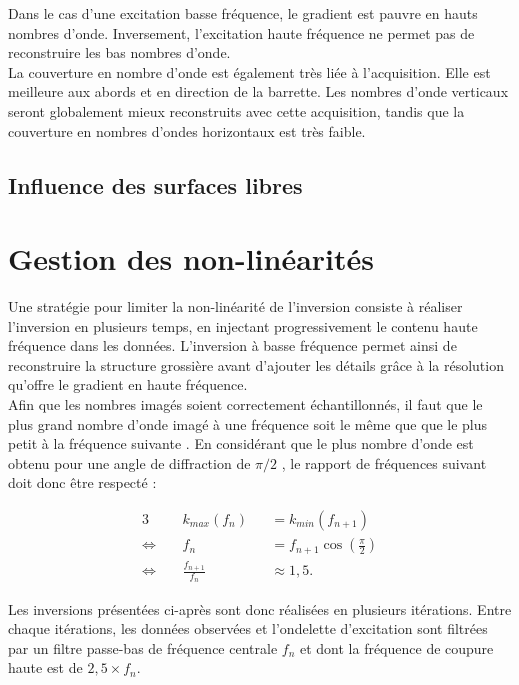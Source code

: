 Dans le cas d'une excitation basse fréquence, le gradient est pauvre en hauts nombres d'onde. Inversement, l'excitation haute fréquence ne permet pas de reconstruire les bas nombres d'onde.\\
La couverture en nombre d'onde est également très liée à l'acquisition. Elle est meilleure aux abords et en direction de la barrette. Les nombres d'onde verticaux seront globalement mieux reconstruits avec cette acquisition, tandis que la couverture en nombres d'ondes horizontaux est très faible.

\subsection{Influence des surfaces libres}


\section{Gestion des non-linéarités}
Une stratégie pour limiter la non-linéarité de l'inversion consiste à réaliser l'inversion en plusieurs temps, en injectant progressivement le contenu haute fréquence dans les données. L'inversion à basse fréquence permet ainsi de reconstruire la structure grossière avant d'ajouter les détails grâce à la résolution qu'offre le gradient en haute fréquence.\\



Afin que les nombres imagés soient correctement échantillonnés, il faut que le plus grand nombre d'onde imagé à une fréquence soit le même que que le plus petit à la fréquence suivante \citep{sirgue}. En considérant que le plus nombre d'onde est obtenu pour une angle de diffraction de $\pi/2$ , le rapport de fréquences suivant doit donc être respecté : 

\begin{alignat*}{3}
	  ~&k_{max}(f_{n}) &&= k_{min}(f_{n+1})\\
	\Leftrightarrow~~~~~ &  f_n &&= f_{n+1}\cos \left(\frac{\pi}{2} \right)\\
	 \Leftrightarrow~~~~~ & \frac{f_{n+1}}{f_n} && \approx  1,5.
\end{alignat*} 

Les inversions présentées ci-après sont donc réalisées en plusieurs itérations. Entre chaque itérations, les données observées et l'ondelette d'excitation sont filtrées par un filtre passe-bas de fréquence centrale $f_{n}$ et dont la fréquence de coupure haute est de $2,5 \times f_{n}$.


